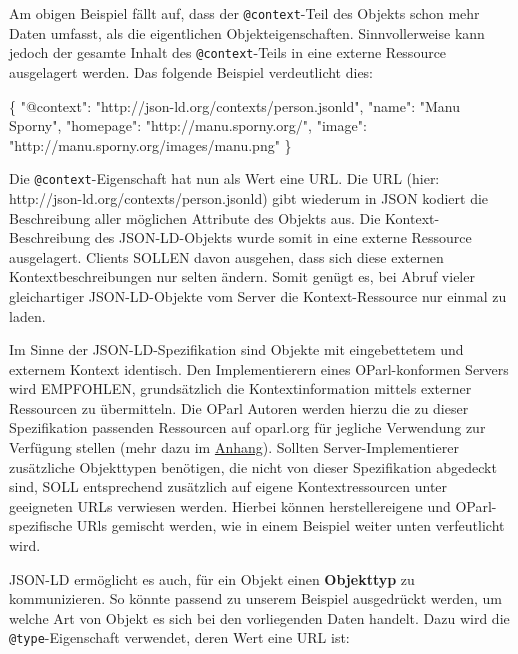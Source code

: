 \documentclass[,a4paper]{article}
\newenvironment{Shaded}{}{}
\newcommand{\DataTypeTok}[1]{\textcolor[rgb]{0.56,0.13,0.00}{{#1}}}
\newcommand{\StringTok}[1]{\textcolor[rgb]{0.25,0.44,0.63}{{#1}}}
\newcommand{\NormalTok}[1]{{#1}}
\begin{document}
Am obigen Beispiel fällt auf, dass der \texttt{@context}-Teil des
Objekts schon mehr Daten umfasst, als die eigentlichen
Objekteigenschaften. Sinnvollerweise kann jedoch der gesamte Inhalt des
\texttt{@context}-Teils in eine externe Ressource ausgelagert werden.
Das folgende Beispiel verdeutlicht dies:

\begin{Shaded}
\begin{Highlighting}[]
\NormalTok{\{}
  \DataTypeTok{"@context"}\NormalTok{: }\StringTok{"http://json-ld.org/contexts/person.jsonld"}\NormalTok{,}
  \DataTypeTok{"name"}\NormalTok{: }\StringTok{"Manu Sporny"}\NormalTok{,}
  \DataTypeTok{"homepage"}\NormalTok{: }\StringTok{"http://manu.sporny.org/"}\NormalTok{,}
  \DataTypeTok{"image"}\NormalTok{: }\StringTok{"http://manu.sporny.org/images/manu.png"}
\NormalTok{\}}
\end{Highlighting}
\end{Shaded}

Die \texttt{@context}-Eigenschaft hat nun als Wert eine URL. Die URL
(hier: http://json-ld.org/contexts/person.jsonld) gibt wiederum in JSON
kodiert die Beschreibung aller möglichen Attribute des Objekts aus. Die
Kontext-Beschreibung des JSON-LD-Objekts wurde somit in eine externe
Ressource ausgelagert. Clients SOLLEN davon ausgehen, dass sich diese
externen Kontextbeschreibungen nur selten ändern. Somit genügt es, bei
Abruf vieler gleichartiger JSON-LD-Objekte vom Server die
Kontext-Ressource nur einmal zu laden.

Im Sinne der JSON-LD-Spezifikation sind Objekte mit eingebettetem und
externem Kontext identisch. Den Implementierern eines OParl-konformen
Servers wird EMPFOHLEN, grundsätzlich die Kontextinformation mittels
externer Ressourcen zu übermitteln. Die OParl Autoren werden hierzu die
zu dieser Spezifikation passenden Ressourcen auf oparl.org für jegliche
Verwendung zur Verfügung stellen (mehr dazu im
\hyperref[jsonldux5fressourcenux5foparlorg]{Anhang}). Sollten
Server-Implementierer zusätzliche Objekttypen benötigen, die nicht von
dieser Spezifikation abgedeckt sind, SOLL entsprechend zusätzlich auf
eigene Kontextressourcen unter geeigneten URLs verwiesen werden. Hierbei
können herstellereigene und OParl-spezifische URls gemischt werden, wie
in einem Beispiel weiter unten verfeutlicht wird.

JSON-LD ermöglicht es auch, für ein Objekt einen \textbf{Objekttyp} zu
kommunizieren. So könnte passend zu unserem Beispiel ausgedrückt werden,
um welche Art von Objekt es sich bei den vorliegenden Daten handelt.
Dazu wird die \texttt{@type}-Eigenschaft verwendet, deren Wert eine URL
ist:
\end{document}
